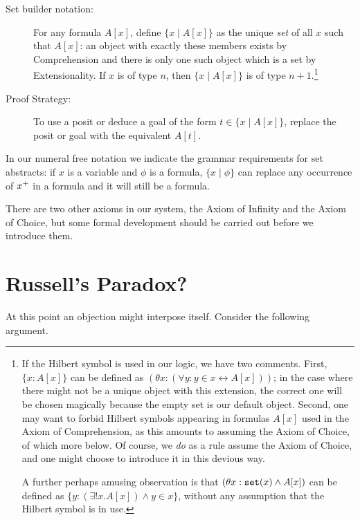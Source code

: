 \documentclass[12pt]{book}
\begin{document}
\begin{description}

\item[Set builder notation:] For any formula $A[x]$, define $\{x \mid
A[x]\}$ as the unique {\em set\/} of all $x$ such that $A[x]$: an object with exactly these members exists by
Comprehension and there is only one such object which is a set by Extensionality.  If $x$ is
of type $n$, then $\{x \mid A[x]\}$ is of type $n+1$.\footnote{If the Hilbert symbol is used in our logic, we have two comments.  First, $\{x:A[x]\}$ can
be defined as $(\theta x:(\forall y:y \in x \leftrightarrow A[x]))$; in the case where there might  not be a unique object with this extension, the correct one will be chosen magically because the empty set is our default object.  Second, one may want to forbid Hilbert symbols appearing in formulas $A[x]$ used in the Axiom of Comprehension, as this amounts to assuming the Axiom of Choice, of which more below.  Of course, we {\em do\/} as a rule assume the Axiom of Choice, and one might choose to introduce it in this devious way.

A further perhaps amusing observation is that $(\theta x:{\tt set}(x) \wedge A[x])$ can be defined as $\{y:(\exists!x.A[x]) \wedge y \in x\}$, without any assumption that the Hilbert symbol is in use.}

\item[Proof Strategy:] To use a posit or deduce a goal of the form $t
\in \{x \mid A[x]\}$, replace the posit or goal with the equivalent
$A[t]$.

\end{description}

In our numeral free notation we indicate the grammar requirements for
set abstracts: if $x$ is a variable and $\phi$ is a formula, $\{x
\mid \phi\}$ can replace any occurrence of $x^{\bf +}$ in a formula and it
will still be a formula.

There are two other axioms in our system, the Axiom of Infinity and
the Axiom of Choice, but some formal development should be carried out
before we introduce them.

\newpage

\section{Russell's Paradox?}

At this point an objection might interpose itself.  Consider the
following argument.
\end{document}
